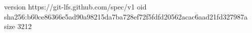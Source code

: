 version https://git-lfs.github.com/spec/v1
oid sha256:b60ce86366e5ad90a98215da7ba728ef72f5fdfd20562acac6aad21fd327987a
size 3212
